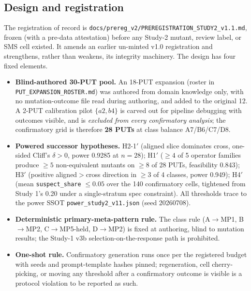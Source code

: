 \documentclass[manuscript,screen,review]{acmart}
\begin{document}
\subsection{Design and registration}\label{study2-design}

The registration of record is
\texttt{docs/prereg\_v2/PREREGISTRATION\_STUDY2\_v1.1.md}, frozen (with a
pre-data attestation) before any Study-2 mutant, review label, or SMS
cell existed. It amends an earlier un-minted v1.0 registration and
strengthens, rather than weakens, its integrity machinery. The design
has four fixed elements.

\begin{itemize}

\item
  \textbf{Blind-authored 30-PUT pool.} An 18-PUT expansion (roster in
  \texttt{PUT\_EXPANSION\_ROSTER.md}) was authored from domain knowledge
  only, with no mutation-outcome file read during authoring, and added
  to the original 12. A 2-PUT calibration pilot \(\{a2, b4\}\) is carved
  out for pipeline debugging with outcomes visible, and is
  \emph{excluded from every confirmatory analysis}; the confirmatory
  grid is therefore \textbf{28 PUTs} at class balance A7/B6/C7/D8.
\item
  \textbf{Powered successor hypotheses.} H2-1\('\) (aligned slice
  dominates cross, one-sided Cliff's \(\delta > 0\), power 0.9285 at
  \(n = 28\)); H1\('\) (\(\geq 4\) of 5 operator families produce
  \(\geq 5\) non-equivalent mutants on \(\geq 8\) of 28 PUTs, feasibility
  0.843); H3\('\) (positive aligned\(>\)cross direction in \(\geq 3\) of
  4 classes, power 0.949); H4\('\) (mean \texttt{suspect\_share}
  \(\leq 0.05\) over the 140 confirmatory cells, tightened from Study
  1's 0.20 under a single-stratum spec constraint). All thresholds trace
  to the power SSOT \texttt{power\_study2\_v11.json} (seed 20260708).
\item
  \textbf{Deterministic primary-meta-pattern rule.} The class rule
  (A\(\to\)MP1, B\(\to\)MP2, C\(\to\)MP5-held, D\(\to\)MP2) is fixed at
  authoring, blind to mutation results; the Study-1 v3b
  selection-on-the-response path is prohibited.
\item
  \textbf{One-shot rule.} Confirmatory generation runs once per the
  registered budget with seeds and prompt-template hashes pinned;
  regeneration, cell cherry-picking, or moving any threshold after a
  confirmatory outcome is visible is a protocol violation to be reported
  as such.
\end{itemize}
\end{document}
